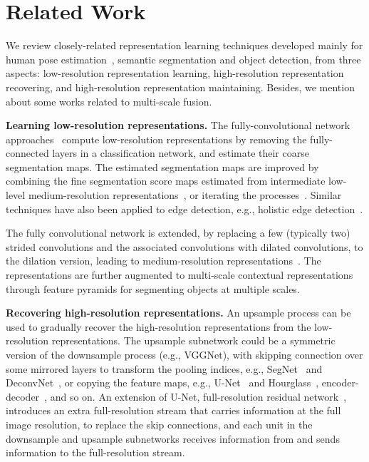 \documentclass[10pt,journal,compsoc]{IEEEtran}
\begin{document}
\section{Related Work}
We review closely-related representation learning techniques developed 
mainly for human pose estimation~\cite{HuR16},
semantic segmentation
and object detection,
from three aspects:
low-resolution representation learning,
high-resolution representation recovering, 
and high-resolution representation maintaining. 
Besides,
we mention about some works
related to multi-scale fusion.


\noindent\textbf{Learning low-resolution representations.}
The fully-convolutional network approaches~\cite{LongSD15,SermanetEZMFL13}
compute low-resolution representations
by removing the fully-connected layers in a classification network,
and estimate their coarse segmentation maps.
The estimated segmentation maps are improved
by combining the fine segmentation score maps
estimated from intermediate low-level medium-resolution representations~\cite{LongSD15},
or iterating the processes~\cite{KowalskiNT17}.
Similar techniques have also been applied 
to edge detection, e.g., holistic edge detection~\cite{XieT15}.

The fully convolutional network
is extended,
by replacing a few (typically two) strided convolutions 
and the associated convolutions with dilated convolutions,
to the dilation version,
leading to medium-resolution representations~\cite{ZhaoSQWJ17,ChenPKMY18, YuKF17,ChenPKMY14, LiPYZDS18}.
The representations are further augmented
to multi-scale contextual representations~\cite{ZhaoSQWJ17,ChenPKMY18,ChenYWXY16} through feature pyramids
for segmenting objects at multiple scales.

\vspace{.1cm}
\noindent\textbf{Recovering high-resolution representations.}
An upsample process
can be used
to gradually recover the high-resolution representations
from the low-resolution representations.
The upsample subnetwork could be a symmetric version
of the downsample process (e.g., VGGNet),
with skipping connection over some mirrored layers 
to transform the pooling indices, 
e.g., SegNet~\cite{BadrinarayananK17} and DeconvNet~\cite{NohHH15},
or copying the feature maps, e.g., U-Net~\cite{RonebergerFB15} and Hourglass~\cite{NewellYD16, ChuYOMYW17, YangLOLW17, KeCQL18, YangLZ17, BulatT17, DengTZZ17, BulatT17a, TangYW18},
encoder-decoder~\cite{PengFWM16}, and so on.
An extension of U-Net,
full-resolution residual network~\cite{PohlenHML17},
introduces an extra full-resolution stream
that carries information at the full image resolution,
to replace the skip connections,
and each unit in the downsample and upsample subnetworks
receives information from and sends information to
the full-resolution stream.
\end{document}

